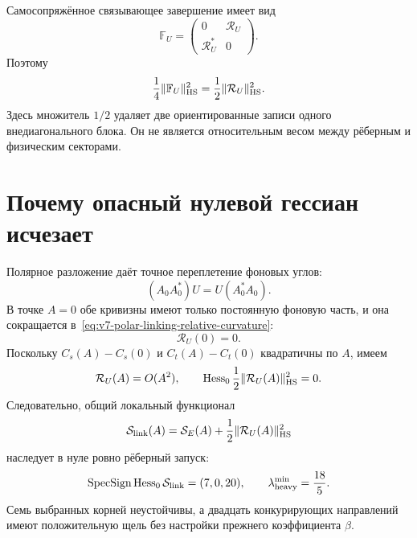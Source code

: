 Самосопряжённое связывающее завершение имеет вид
\begin{equation}
 \mathbb F_U=
 \begin{pmatrix}
  0&\mathcal R_U\\
  \mathcal R_U^*&0
 \end{pmatrix}.
 \label{eq:v7-polar-linking-selfadjoint-completion}
\end{equation}
Поэтому
\begin{equation}
 \frac14\|\mathbb F_U\|_{\rm HS}^2
 =\frac12\|\mathcal R_U\|_{\rm HS}^2.
 \label{eq:v7-polar-linking-half-trace-identity}
\end{equation}
Здесь множитель $1/2$ удаляет две ориентированные записи одного
внедиагонального блока. Он не является относительным весом между рёберным и
физическим секторами.

\section{Почему опасный нулевой гессиан исчезает}

Полярное разложение даёт точное переплетение фоновых углов:
\begin{equation}
 (A_0A_0^*)U=U(A_0^*A_0).
 \label{eq:v7-polar-linking-background-intertwining}
\end{equation}
В точке $A=0$ обе кривизны имеют только постоянную фоновую часть, и она
сокращается в~\eqref{eq:v7-polar-linking-relative-curvature}:
\begin{equation}
 \mathcal R_U(0)=0.
 \label{eq:v7-polar-linking-zero-background}
\end{equation}
Поскольку $C_s(A)-C_s(0)$ и $C_t(A)-C_t(0)$ квадратичны по $A$, имеем
\begin{equation}
 \mathcal R_U(A)=O(A^2),
 \qquad
 \operatorname{Hess}_0\frac12\|\mathcal R_U(A)\|_{\rm HS}^2=0.
 \label{eq:v7-polar-linking-zero-hessian}
\end{equation}
Следовательно, общий локальный функционал
\begin{equation}
 \mathcal S_{\rm link}(A)
 =\mathcal S_E(A)+\frac12\|\mathcal R_U(A)\|_{\rm HS}^2
 \label{eq:v7-polar-linking-action}
\end{equation}
наследует в нуле ровно рёберный запуск:
\begin{equation}
 \operatorname{SpecSign}\operatorname{Hess}_0\mathcal S_{\rm link}
 =(7,0,20),
 \qquad
 \lambda_{\rm heavy}^{\min}=\frac{18}{5}.
 \label{eq:v7-polar-linking-origin-signature}
\end{equation}
Семь выбранных корней неустойчивы, а двадцать конкурирующих направлений
имеют положительную щель без настройки прежнего коэффициента $\beta$.

